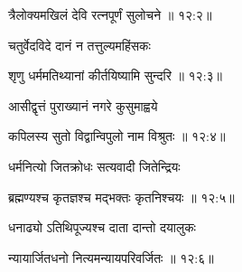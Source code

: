 
{\devanagarifont त्रैलोक्यमखिलं देवि रत्नपूर्णं सुलोचने {॥ १२:२॥} \veg\dontdisplaylinenum }%

{\devanagarifont चतुर्वेदविदे दानं न तत्तुल्यमहिंसकः \thinspace{\dandab} \dontdisplaylinenum }%


{\devanagarifont शृणु धर्ममतिथ्यानां कीर्तयिष्यामि सुन्दरि {॥ १२:३॥} \veg\dontdisplaylinenum }%
 

{\devanagarifont आसीद्वृत्तं पुराख्यानं नगरे कुसुमाह्वये \thinspace{\dandab} \dontdisplaylinenum }%


{\devanagarifont कपिलस्य सुतो विद्वान्विपुलो नाम विश्रुतः {॥ १२:४॥} \veg\dontdisplaylinenum }%
 
{\devanagarifont धर्मनित्यो जितक्रोधः सत्यवादी जितेन्द्रियः \thinspace{\dandab} \dontdisplaylinenum }%


{\devanagarifont ब्रह्मण्यश्च कृतज्ञश्च मद्भक्तः कृतनिश्चयः {॥ १२:५॥} \veg\dontdisplaylinenum }%

{\devanagarifont धनाढ्यो ऽतिथिपूज्यश्च दाता दान्तो दयालुकः \thinspace{\dandab} \dontdisplaylinenum }%


{\devanagarifont न्यायार्जितधनो नित्यमन्यायपरिवर्जितः {॥ १२:६॥} \veg\dontdisplaylinenum }%

